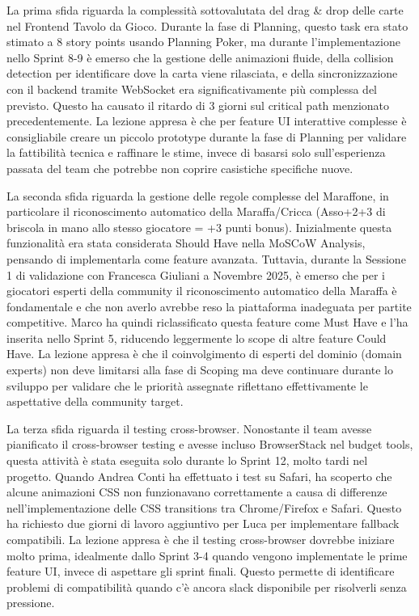 La prima sfida riguarda la complessità sottovalutata del drag \& drop delle carte nel Frontend Tavolo da Gioco. Durante la fase di Planning, questo task era stato stimato a 8 story points usando Planning Poker, ma durante l'implementazione nello Sprint 8-9 è emerso che la gestione delle animazioni fluide, della collision detection per identificare dove la carta viene rilasciata, e della sincronizzazione con il backend tramite WebSocket era significativamente più complessa del previsto. Questo ha causato il ritardo di 3 giorni sul critical path menzionato precedentemente. La lezione appresa è che per feature UI interattive complesse è consigliabile creare un piccolo prototype durante la fase di Planning per validare la fattibilità tecnica e raffinare le stime, invece di basarsi solo sull'esperienza passata del team che potrebbe non coprire casistiche specifiche nuove.

La seconda sfida riguarda la gestione delle regole complesse del Maraffone, in particolare il riconoscimento automatico della Maraffa/Cricca (Asso+2+3 di briscola in mano allo stesso giocatore = +3 punti bonus). Inizialmente questa funzionalità era stata considerata Should Have nella MoSCoW Analysis, pensando di implementarla come feature avanzata. Tuttavia, durante la Sessione 1 di validazione con Francesca Giuliani a Novembre 2025, è emerso che per i giocatori esperti della community il riconoscimento automatico della Maraffa è fondamentale e che non averlo avrebbe reso la piattaforma inadeguata per partite competitive. Marco ha quindi riclassificato questa feature come Must Have e l'ha inserita nello Sprint 5, riducendo leggermente lo scope di altre feature Could Have. La lezione appresa è che il coinvolgimento di esperti del dominio (domain experts) non deve limitarsi alla fase di Scoping ma deve continuare durante lo sviluppo per validare che le priorità assegnate riflettano effettivamente le aspettative della community target.

La terza sfida riguarda il testing cross-browser. Nonostante il team avesse pianificato il cross-browser testing e avesse incluso BrowserStack nel budget tools, questa attività è stata eseguita solo durante lo Sprint 12, molto tardi nel progetto. Quando Andrea Conti ha effettuato i test su Safari, ha scoperto che alcune animazioni CSS non funzionavano correttamente a causa di differenze nell'implementazione delle CSS transitions tra Chrome/Firefox e Safari. Questo ha richiesto due giorni di lavoro aggiuntivo per Luca per implementare fallback compatibili. La lezione appresa è che il testing cross-browser dovrebbe iniziare molto prima, idealmente dallo Sprint 3-4 quando vengono implementate le prime feature UI, invece di aspettare gli sprint finali. Questo permette di identificare problemi di compatibilità quando c'è ancora slack disponibile per risolverli senza pressione.

